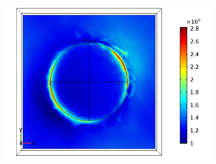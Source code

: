 \begin{figure}[htb!]
\begin{subfigure}{0.32\textwidth}
        \centering
        \includegraphics[width=\linewidth]{figures/ch4/S5A/FieldDistribution/phi25/Sample5A_TM_Slice@z=0_wl=500_phi=25.png}
   \end{subfigure}
   \vspace{0.7cm}
   

\end{figure}
